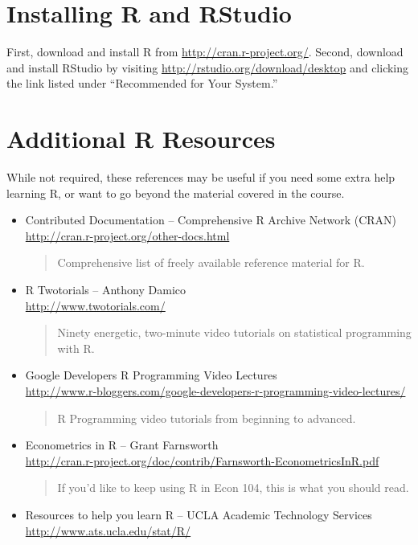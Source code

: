 \documentclass[11pt, letterpaper]{article}
\begin{document}
\section*{Installing R and RStudio} First, download and install R from \url{http://cran.r-project.org/}. Second, download and install RStudio by visiting \url{http://rstudio.org/download/desktop} and clicking the link listed under ``Recommended for Your System.'' 

\bigskip

\section*{Additional R Resources} While not required, these references may be useful if you need some extra help learning R, or want to go beyond the material covered in the course.
\begin{itemize}
		       \item Contributed Documentation -- Comprehensive R Archive Network (CRAN) \\\url{http://cran.r-project.org/other-docs.html}
           	\begin{quote}
           		Comprehensive list of freely available reference material for R.
           	\end{quote}
\item R Twotorials -- Anthony Damico \\\url{http://www.twotorials.com/}
		\begin{quote}
		Ninety energetic, two-minute video tutorials on statistical programming with R. 
		\end{quote}
			\item Google Developers R Programming Video Lectures\\ \url{http://www.r-bloggers.com/google-developers-r-programming-video-lectures/}\begin{quote}R Programming video tutorials from beginning to advanced. \end{quote}
		 	\item Econometrics in R -- Grant Farnsworth\\\url{http://cran.r-project.org/doc/contrib/Farnsworth-EconometricsInR.pdf}
 		\begin{quote}
 		If you'd like to keep using R in Econ 104, this is what you should read.
 		\end{quote}
 			\item Resources to help you learn R -- UCLA Academic Technology Services \\\url{http://www.ats.ucla.edu/stat/R/}

\end{itemize}
\end{document}
